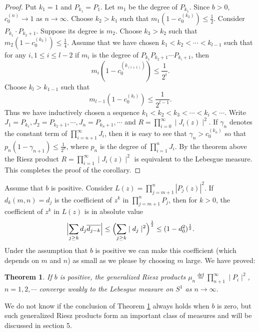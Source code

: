 \documentclass{amsart}
\newtheorem{Th}{Theorem}[section]
\theoremstyle{definition}
\theoremstyle{remark}
\numberwithin{equation}{section}
\newcommand{\egdef}{\stackrel{\textrm {def}}{=}}
\newcommand{\1}{\mathbb{1}}
\begin{document}
\begin{proof}
Put $k_1 =1$ and $ P_{k_1} = P_1$. Let $m_1$ be the degree of $P_{k_1}$. Since $b > 0$,
$c_0^{(n)} \rightarrow 1$ as $n\rightarrow \infty$. Choose $k_2 > k_1$ such that $m_1 (1 - c_0^{(k_2)})  \leq \frac{1}{2}$. Consider $P_{k_1}\cdot P_{k_2+1}$. Suppose its degree is $m_2$. Choose $k_3 > k_2$ such that
$m_2(1-c_0^{(k_3)})\leq \frac{1}{4} $. Assume that we have chosen $k_1< k_2 < \cdots< k_{l-1}$ such that for any $i, 1\leq i \leq l-2 $ if $m_i$ is the degree of $P_{k_1}P_{k_2+1}\cdots P_{k_i+1}$, then $$m_i(1 - c_0^{(k_{(i+1)})}) \leq \frac{1}{2^i}.$$ Choose
$k_{l}> k_{1-1}$ such that $$m_{l-1}(1 - c_0^{(k_l)}) \leq \frac{1}{2^{l-1}}.$$
Thus we have inductively chosen a sequence  $k_1 < k_2 < k_3 < \cdots  < k_i < \cdots$.
Write  $J_1 = P_{k_1}, J_2 = P_{k_2+1}, \cdots, J_n = P_{k_n+1}, \cdots$ and  $R = \prod_{i=0}^\infty \mid J_i(z) \mid^2 $. If $\gamma_n$ denotes the constant term of $ \prod_{i=n+1}^\infty J_i$, then it is easy to see that $\gamma_n > c_0^{(k_n)}$
so that $p_n(1 -\gamma_{n+1}) \leq \frac{1}{2^n}$, where $p_n$ is the degree of $ \prod_{i=1}^n J_i$. By the theorem above the Riesz product $R = \prod_{i=1}^\infty \mid J_i(z)\mid ^2$ is equivalent to the Lebesgue measure.
This completes the proof of the corollary.
\end{proof}
Assume that $b$ is positive. Consider $L(z) = \prod_{j=m+1}^n| P_j(z)|^2$. If $d_k(m,n) = d_j$ is the coefficient of $z^k$
in $\prod_{j = m+1}^n P_j$, then for $k >0$, the coefficient of $z^k$ in $L(z)$ is in absolute value
$$\Bigl| \sum_{j \geq k} d_j\overline{d_{j-k}}\Bigr| \leq \Bigl(\sum_{j \geq k}\mid d_j\mid^2\Bigr)^{\frac{1}{2}}\leq (1 - d^2_0)^{\frac{1}{2}}. $$
Under the assumption that $b$ is positive we can make this coefficient (which depends on $m$ and $n$) as small as we please by choosing $m$ large. We have proved:\\
\begin{Th}\label{th4}
If $b$ is positive, the generalized Riesz products $\mu_{n} \egdef \prod_{n+1}^\infty\mid P_i\mid^2$,
$n=1,2,\cdots$ converge weakly to the Lebesgue measure on $S^1$ as $n \rightarrow \infty$.
\end{Th}
We do not know if the conclusion of Theorem \ref{th4} always holds when $b$ is zero, but such generalized Riesz products form an important class of measures and will be discussed in section 5.
\end{document}
